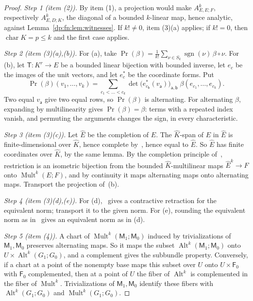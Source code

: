 \documentclass[11pt]{amsart}
\theoremstyle{definition}
\theoremstyle{remark}
\numberwithin{equation}{section}
\newcommand{\Alt}{\operatorname{Alt}}
\newcommand{\Mult}{\operatorname{Mult}}
\newcommand{\sgn}{\operatorname{sgn}}
\newcommand{\Kh}{\widehat K}
\theoremstyle{plain}
\theoremstyle{definition}
\theoremstyle{plain}
\begin{document}
\begin{proof}
\emph{Step 1 (item (2)).} By item (1), a projection would make $A^k_{E,E;F}$, respectively $A^k_{E,D;K}$, the diagonal of a bounded $k$\nobreakdash-linear map, hence analytic, against Lemma~\ref{dp:fn:lem:witnesses}. If $k!\ne0$, item (3)(a) applies; if $k!=0$, then $\operatorname{char}K=p\le k$ and the first case applies.

\emph{Step 2 (item (3)(a),(b)).} For (a), take $\operatorname{Pr}(\beta)=\frac1{k!}\sum_{\nu\in S_k}\sgn(\nu)\,\beta\circ\nu$. For (b), let $\mathsf T\colon K^r\to E$ be a bounded linear bijection with bounded inverse, let $e_c$ be the images of the unit vectors, and let $e^*_c$ be the coordinate forms. Put
\[
 \operatorname{Pr}(\beta)(v_1,\dots,v_k)=\sum_{c_1<\dots<c_k}\det\bigl(e^*_{c_{\mathsf b}}(v_{\mathsf a})\bigr)_{\mathsf a,\mathsf b}\;\beta(e_{c_1},\dots,e_{c_k}).
\]
Two equal $v_{\mathsf a}$ give two equal rows, so $\operatorname{Pr}(\beta)$ is alternating. For alternating $\beta$, expanding by multilinearity gives $\operatorname{Pr}(\beta)=\beta$: terms with a repeated index vanish, and permuting the arguments changes the sign, in every characteristic.

\emph{Step 3 (item (3)(c)).} Let $\widehat E$ be the completion of $E$. The $\Kh$-span of $E$ in $\widehat E$ is finite-dimensional over $\Kh$, hence complete by~\cite[Lemma~A.3]{I}, hence equal to $\widehat E$. So $\widehat E$ has finite coordinates over $\Kh$, by the same lemma. By the completion principle of~\cite[text before Lemma~H.5]{I}, restriction is an isometric bijection from the bounded $\Kh$-multilinear maps $\widehat E^k\to F$ onto $\Mult^k(E;F)$, and by continuity it maps alternating maps onto alternating maps. Transport the projection of~(b).

\emph{Step 4 (item (3)(d),(e)).} For (d),~\cite[Theorem~5.2]{I} gives a contractive retraction for the equivalent norm; transport it to the given norm. For (e), rounding the equivalent norm as in~\cite[proof of Corollary~5.3]{I} gives an equivalent norm as in (d).

\emph{Step 5 (item (4)).} A chart of $\Mult^k(\mathsf M_1;\mathsf M_0)$ induced by trivializations of $\mathsf M_1,\mathsf M_0$ preserves alternating maps. So it maps the subset $\Alt^k(\mathsf M_1;\mathsf M_0)$ onto $U\times\Alt^k(G_1;G_0)$, and a complement gives the subbundle property. Conversely, if a chart at a point of the nonempty base maps this subset over $U$ onto $U\times\mathsf F_0$ with $\mathsf F_0$ complemented, then at a point of $U$ the fiber of $\Alt^k$ is complemented in the fiber of $\Mult^k$. Trivializations of $\mathsf M_1,\mathsf M_0$ identify these fibers with $\Alt^k(G_1;G_0)$ and $\Mult^k(G_1;G_0)$.
\end{proof}
\end{document}
